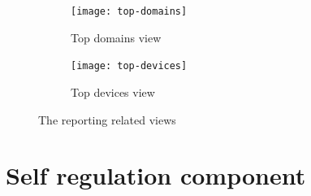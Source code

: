\begin{figure}
\centering
\begin{subfigure}{.5\textwidth}
  \centering
  \texttt{[image: top-domains]}
  \caption{Top domains view}
  \label{fig:top-domains}
\end{subfigure}%
\begin{subfigure}{.5\textwidth}
  \centering
  \texttt{[image: top-devices]}
  \caption{Top devices view}
  \label{fig:top-devices}
\end{subfigure}
\caption{The reporting related views}
\label{fig:top-views}
\end{figure}

\section{Self regulation component}

